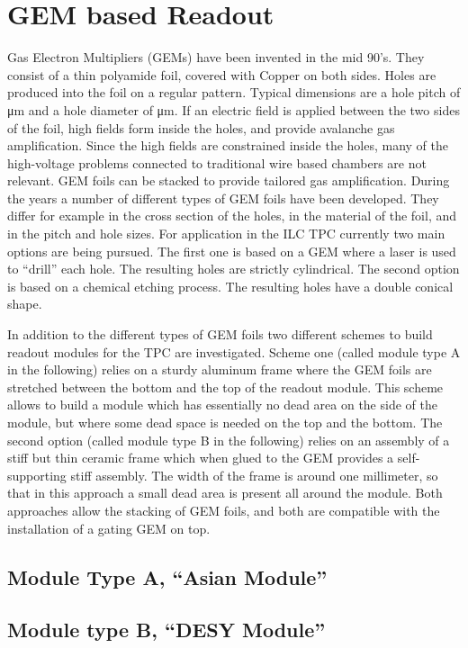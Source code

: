 \section{GEM based Readout}\label{chap:TPC_sec:standard_gems}

Gas Electron Multipliers (GEMs) \cite{Sauli1997531} have been invented in the mid 90's. They consist of a thin polyamide foil, covered with Copper on both sides. Holes are produced into the foil on a regular pattern. Typical dimensions are a hole pitch of \unit[140]{\micro m} and a hole diameter of \unit[70]{\micro m}. If an electric field is applied between the two sides of the foil, high fields form inside the holes, and provide avalanche gas amplification. Since the high fields are constrained inside the holes, many of the high-voltage problems connected to traditional wire based chambers are not relevant. GEM foils can be stacked to provide tailored gas amplification. During the years a number of different types of GEM foils have been developed. They differ for example in the cross section of the holes, in the material of the foil, and in the pitch and hole sizes. For application in the ILC TPC currently two main options are being pursued. The first one is based on a GEM where a laser is used to ``drill'' each hole.
The resulting holes are
strictly cylindrical. The second option is based on a chemical etching process. The resulting holes have a double conical shape.

In addition to the different types of GEM foils two different schemes to build readout modules for the TPC are investigated. Scheme one (called module type A in the following) relies on a sturdy aluminum frame where the GEM foils are stretched between the bottom and the top of the readout module. This scheme allows to build a module which has essentially no dead area on the side of the module, but where some dead space is needed on the top and the bottom. The second option (called module type B in the following) relies on an assembly of a stiff but thin ceramic frame which when glued to the GEM provides a self-supporting stiff assembly. The width of the frame is around one millimeter, so that in this approach a small dead area is present all around the module. Both approaches allow the stacking of GEM foils, and both are compatible with the installation of a gating GEM on top.

\subsection{Module Type A, ``Asian Module''}

\subsection{Module type B, ``DESY Module''}

